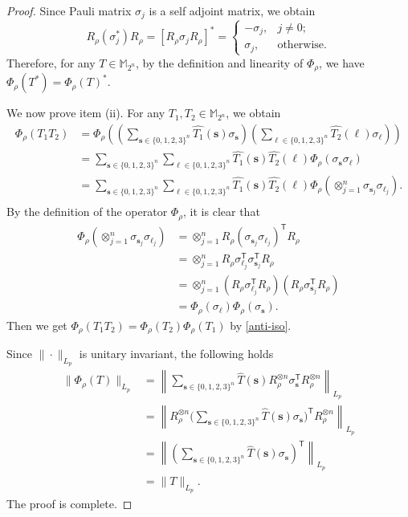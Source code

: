 \documentclass{amsbook}
\theoremstyle{definition}
\theoremstyle{remark}
\numberwithin{section}{chapter}
\numberwithin{equation}{chapter}
\newcommand{\1}{\mathbf{1}}
\begin{document}
\begin{proof} Since Pauli matrix $\sigma_{j}$  is a self adjoint matrix, we obtain
$$R_\rho(\sigma_{j}^*)R_\rho=[R_\rho\sigma_{j}R_\rho]^*= 
\begin{cases} 
-\sigma_j, & j \neq 0; \\ 
\sigma_j, & \text{otherwise.} 
\end{cases}$$
Therefore, for any $T\in\mathbb{M}_{2^n}$, by the definition and linearity of $\varPhi_\rho$, we have $\varPhi_\rho(T^*)=\varPhi_\rho(T)^*$.

We now prove item (ii). For any $T_1,T_2 \in \mathbb{M}_{2^n}$, we obtain
\begin{align}\label{anti-iso}
\varPhi_\rho(T_1T_2)&=\varPhi_\rho\left(\left(\sum_{\mathbf{s}\in\{0,1,2,3\}^n} \widehat{T_1}(\mathbf{s}) \sigma_{\mathbf{s}}\right)\left(\sum_{\mathbf{\ell}\in\{0,1,2,3\}^n} \widehat{T_2}(\mathbf{\ell}) \sigma_{\mathbf{\ell}}\right)\right)\nonumber\\
&=\sum_{\mathbf{s}\in\{0,1,2,3\}^n}\sum_{\mathbf{\ell}\in\{0,1,2,3\}^n}\widehat{T_1}(\mathbf{s})\widehat{T_2}(\mathbf{\ell})\varPhi_\rho(\sigma_{\mathbf{s}}\sigma_{\mathbf{\ell}})\\
&=\sum_{\mathbf{s}\in\{0,1,2,3\}^n}\sum_{\mathbf{\ell}\in\{0,1,2,3\}^n}\widehat{T_1}(\mathbf{s})\widehat{T_2}(\mathbf{\ell})\varPhi_\rho(\otimes_{j=1}^n\sigma_{\mathbf{s}_j}\sigma_{\mathbf{\ell}_j})\nonumber.\\\nonumber
\end{align}
By the definition of the operator $\varPhi_\rho$, it is clear that
\begin{align*}
\varPhi_\rho\left(\otimes_{j=1}^n\sigma_{\mathbf{s}_j}\sigma_{\mathbf{\ell}_j}\right)&=\otimes_{j=1}^nR_\rho(\sigma_{\mathbf{s}_j}\sigma_{\mathbf{\ell}_j})^{\mathsf T}R_\rho\\
&=\otimes_{j=1}^nR_\rho\sigma_{\mathbf{\ell}_j}^{\mathsf T}\sigma_{\mathbf{s}_j}^{\mathsf T}R_\rho\\
&=\otimes_{j=1}^n(R_\rho\sigma_{\mathbf{\ell}_j}^{\mathsf T}R_\rho) (R_\rho\sigma_{\mathbf{s}_j}^{\mathsf T}R_\rho)\\
&=\varPhi_\rho(\sigma_{\mathbf{\ell}})\varPhi_\rho(\sigma_{\mathbf{s}}).
\end{align*}
Then we get $\varPhi_\rho(T_1T_2)=\varPhi_\rho(T_2)\varPhi_\rho(T_1)$ by \eqref{anti-iso}.

Since $\|\cdot\|_{L_{p}}$ is unitary invariant, the following holds
\begin{align*}
\|\varPhi_\rho(T)\|_{L_{p}}&=\left\|\sum_{\mathbf{s} \in \{0,1,2,3\}^n} \widehat{T}(\mathbf{s}) R_\rho^{\otimes n}\sigma_{\mathbf{s}}^{\mathsf T}R_\rho^{\otimes n}\right\|_{L_{p}}\\
&=\left\|R_\rho^{\otimes n}\big(\sum_{\mathbf{s} \in \{0,1,2,3\}^n} \widehat{T}(\mathbf{s}) \sigma_{\mathbf{s}}\big)^{\mathsf T}R_\rho^{\otimes n}\right\|_{L_{p}}\\
&=\left\|\left(\sum_{\mathbf{s} \in \{0,1,2,3\}^n} \widehat{T}(\mathbf{s}) \sigma_{\mathbf{s}}\right)^{\mathsf T}\right\|_{L_{p}}\\
&=\|T\|_{L_{p}}.
\end{align*}
The proof is complete.
\end{proof}
\end{document}
